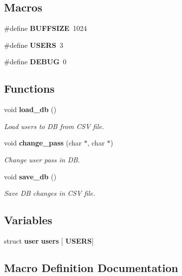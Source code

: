 \subsection*{Macros}
\begin{DoxyCompactItemize}
\item 
\#define \textbf{ B\+U\+F\+F\+S\+I\+ZE}~1024
\item 
\#define \textbf{ U\+S\+E\+RS}~3
\item 
\#define \textbf{ D\+E\+B\+UG}~0
\end{DoxyCompactItemize}
\subsection*{Functions}
\begin{DoxyCompactItemize}
\item 
void \textbf{ load\+\_\+db} ()
\begin{DoxyCompactList}\small\item\em Load users to DB from C\+SV file. \end{DoxyCompactList}\item 
void \textbf{ change\+\_\+pass} (char $\ast$, char $\ast$)
\begin{DoxyCompactList}\small\item\em Change user pass in DB. \end{DoxyCompactList}\item 
void \textbf{ save\+\_\+db} ()
\begin{DoxyCompactList}\small\item\em Save DB changes in C\+SV file. \end{DoxyCompactList}\end{DoxyCompactItemize}
\subsection*{Variables}
\begin{DoxyCompactItemize}
\item 
struct \textbf{ user} \textbf{ users} [\textbf{ U\+S\+E\+RS}]
\end{DoxyCompactItemize}


\subsection{Macro Definition Documentation}
\mbox{\label{auth_8h_a39912bfe2a55f30e269196f9141d845d}} 
